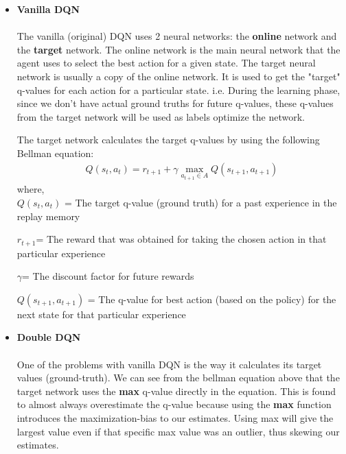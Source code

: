 \documentclass[paper=a4, fontsize=11pt, margin=1in]{scrartcl}
\numberwithin{equation}{section}		%
\numberwithin{figure}{section}			%
\numberwithin{table}{section}				%
\begin{document}
\begin{itemize}
\item \textbf{Vanilla DQN}\\\\
    The vanilla (original) DQN uses 2 neural networks: the \textbf{online} network and the \textbf{target} network. The online network is the main neural network that the agent uses to select the best action for a given state. The target neural network is usually a copy of the online network. It is used to get the "target" q-values for each action for a particular state. i.e. During the learning phase, since we don't have actual ground truths for future q-values, these q-values from the target network will be used as labels optimize the network. 

    The target network calculates the target q-values by using the following Bellman equation: 
    \begin{align}
	Q(s_t, a_t) = 
			r_{t+1} + \gamma \max _{a_{t+1} \in A} Q(s_{t+1}, a_{t+1}) 
    \end{align}
where, \\

\hspace*{10mm}$Q(s_t, a_t)$ \hspace{25}= \hspace{5} The target q-value (ground truth) for a past experience in the \hspace*{39mm}replay memory

\hspace*{10mm}$r_{t+1}$\hspace{46}= \hspace{5} The reward that was obtained for taking the chosen action in \hspace*{39mm}that particular experience

\hspace*{10mm}$\gamma$\hspace{60}= \hspace{5} The discount factor for future rewards

\hspace*{10mm}$Q(s_{t+1}, a_{t+1})$ \hspace{5}= \hspace{5} The q-value for best action (based on the policy) for the next \hspace*{39mm}state for that particular experience
    
    
    \item \textbf{Double DQN}\\\\
    One of the problems with vanilla DQN is the way it calculates its target values (ground-truth).
    We can see from the bellman equation above that the target network uses the \textbf{max} q-value directly in the equation. This is found to almost always overestimate the q-value because using the \textbf{max} function introduces the maximization-bias to our estimates. Using max will give the largest value even if that specific max value was an outlier, thus skewing our estimates.\\


\end{itemize}
\end{document}
